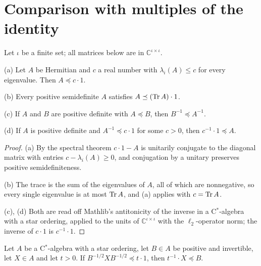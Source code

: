 \section{Comparison with multiples of the identity}

\begin{lemma}
\label{lem:loewner-basic-bounds}
\leanok
Let $\iota$ be a finite set; all matrices below are in $\mathbb{C}^{\iota \times \iota}$.

(a) Let $A$ be Hermitian and $c$ a real number with $\lambda_i(A) \leq c$ for every
eigenvalue. Then $A \preceq c \cdot 1$.

(b) Every positive semidefinite $A$ satisfies $A \preceq (\operatorname{Tr} A) \cdot 1$.

(c) If $A$ and $B$ are positive definite with $A \preceq B$, then
$B^{-1} \preceq A^{-1}$.

(d) If $A$ is positive definite and $A^{-1} \preceq c \cdot 1$ for some $c > 0$, then
$c^{-1} \cdot 1 \preceq A$.
\end{lemma}

\begin{proof}
\leanok
(a) By the spectral theorem $c \cdot 1 - A$ is unitarily conjugate to the diagonal
matrix with entries $c - \lambda_i(A) \geq 0$, and conjugation by a unitary preserves
positive semidefiniteness.

(b) The trace is the sum of the eigenvalues of $A$, all of which are nonnegative, so
every single eigenvalue is at most $\operatorname{Tr} A$, and (a) applies with $c = \operatorname{Tr} A$.

(c), (d) Both are read off Mathlib's antitonicity of the inverse in a C$^*$-algebra with
a star ordering, applied to the units of $\mathbb{C}^{\iota \times \iota}$ with the
$\ell_2$-operator norm; the inverse of $c \cdot 1$ is $c^{-1} \cdot 1$.
\end{proof}

\begin{lemma}
\label{lem:sqrt-conjugation}
\leanok
Let $A$ be a C$^*$-algebra with a star ordering, let $B \in A$ be positive and
invertible, let $X \in A$ and let $t > 0$. If
$B^{-1/2} X B^{-1/2} \preceq t \cdot 1$, then $t^{-1} \cdot X \preceq B$.
\end{lemma}

